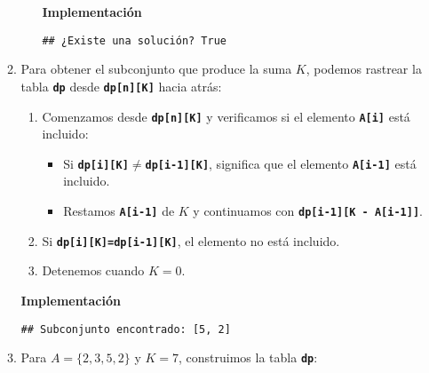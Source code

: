 \begin{enumerate}[label=\color{red}\textbf{\arabic*)}]
\begin{enumerate}[label=\color{red}\textbf{\alph*)}]
\begin{enumerate}[label=\arabic*)]
            \textbf{Implementación}

            
            \begin{verbatim}
## ¿Existe una solución? True
            \end{verbatim}
      \end{enumerate}
    \item {}

      Para obtener el subconjunto que produce la suma $K$, podemos rastrear la tabla  \textbf{\texttt{dp}} desde \textbf{\texttt{dp[n][K]}} hacia atrás:
      \begin{enumerate}[label=\arabic*)]
        \item Comenzamos desde \textbf{\texttt{dp[n][K]}} y verificamos si el elemento \textbf{\texttt{A[i]}} está incluido:
          \begin{itemize}[label=\textbullet]
            \item Si \textbf{\texttt{dp[i][K]$\neq $dp[i-1][K]}}, significa que el elemento \textbf{\texttt{A[i-1]}} está incluido.
            \item Restamos \textbf{\texttt{A[i-1]}} de $K$ y continuamos con \textbf{\texttt{dp[i-1][K - A[i-1]]}}.
          \end{itemize}
        \item Si \textbf{\texttt{dp[i][K]=dp[i-1][K]}}, el elemento no está incluido.
        \item Detenemos cuando $K=0$.
      \end{enumerate}
      \textbf{Implementación}

      

      \begin{verbatim}
## Subconjunto encontrado: [5, 2]
      \end{verbatim}
    \item {} 

      Para $A=\{2,3,5,2\} $ y $K=7$, construimos la tabla  \textbf{\texttt{dp}}:


\end{enumerate}
\end{enumerate}
